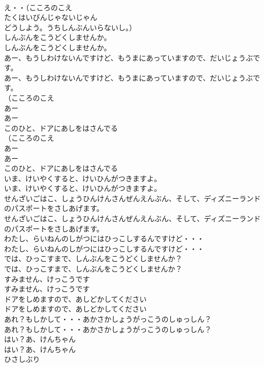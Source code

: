 \documentclass[8pt]{extreport}
\begin{document}
\begin{CJK}{UTF8}{min}
\\	え・・（こころのこえ
\\	たくはいびんじゃないじゃん
\\	どうしよう。うちしんぶんいらないし。）
\\	しんぶんをこうどくしませんか。
\\	しんぶんをこうどくしませんか。
\\	あー、もうしわけないんですけど、もうまにあっていますので、だいじょうぶです。
\\	あー、もうしわけないんですけど、もうまにあっていますので、だいじょうぶです。
\\	（こころのこえ
\\	あー
\\	あー
\\	このひと、ドアにあしをはさんでる
\\	（こころのこえ
\\	あー
\\	あー
\\	このひと、ドアにあしをはさんでる
\\	いま、けいやくすると、けいひんがつきますよ。
\\	いま、けいやくすると、けいひんがつきますよ。
\\	せんざいごはこ、しょうひんけんさんぜんえんぶん、そして、ディズニーランドのパスポートをさしあげます。
\\	せんざいごはこ、しょうひんけんさんぜんえんぶん、そして、ディズニーランドのパスポートをさしあげます。
\\	わたし、らいねんのしがつにはひっこしするんですけど・・・
\\	わたし、らいねんのしがつにはひっこしするんですけど・・・
\\	では、ひっこすまで、しんぶんをこうどくしませんか？
\\	では、ひっこすまで、しんぶんをこうどくしませんか？
\\	すみません、けっこうです
\\	すみません、けっこうです
\\	ドアをしめますので、あしどかしてください
\\	ドアをしめますので、あしどかしてください
\\	あれ？もしかして・・・あかさかしょうがっこうのしゅっしん？
\\	あれ？もしかして・・・あかさかしょうがっこうのしゅっしん？
\\	はい？あ、けんちゃん
\\	はい？あ、けんちゃん
\\	ひさしぶり

\end{CJK}
\end{document}
